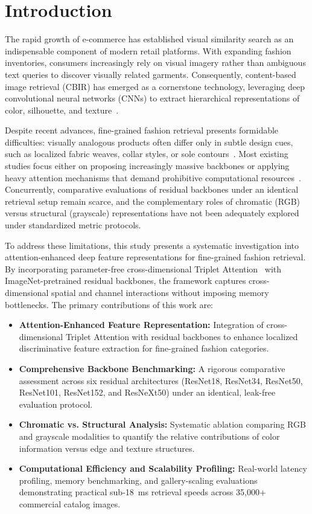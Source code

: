 \documentclass[runningheads]{llncs}
\begin{document}
\section{Introduction}
The rapid growth of e-commerce has established visual similarity search as an indispensable component of modern retail platforms. With expanding fashion inventories, consumers increasingly rely on visual imagery rather than ambiguous text queries to discover visually related garments. Consequently, content-based image retrieval (CBIR) has emerged as a cornerstone technology, leveraging deep convolutional neural networks (CNNs) to extract hierarchical representations of color, silhouette, and texture~\cite{deng2009imagenet,krizhevsky2012imagenet,he2016deep,xie2017aggregated}.

Despite recent advances, fine-grained fashion retrieval presents formidable difficulties: visually analogous products often differ only in subtle design cues, such as localized fabric weaves, collar styles, or sole contours~\cite{liu2016deepfashion,kiapour2015where}. Most existing studies focus either on proposing increasingly massive backbones or applying heavy attention mechanisms that demand prohibitive computational resources~\cite{song2016deep,hu2018squeeze,woo2018cbam,misra2021rotate}. Concurrently, comparative evaluations of residual backbones under an identical retrieval setup remain scarce, and the complementary roles of chromatic (RGB) versus structural (grayscale) representations have not been adequately explored under standardized metric protocols.

To address these limitations, this study presents a systematic investigation into attention-enhanced deep feature representations for fine-grained fashion retrieval. By incorporating parameter-free cross-dimensional Triplet Attention~\cite{misra2021rotate} with ImageNet-pretrained residual backbones, the framework captures cross-dimensional spatial and channel interactions without imposing memory bottlenecks. The primary contributions of this work are:
\begin{itemize}
    \item \textbf{Attention-Enhanced Feature Representation:} Integration of cross-dimensional Triplet Attention with residual backbones to enhance localized discriminative feature extraction for fine-grained fashion categories.
    \item \textbf{Comprehensive Backbone Benchmarking:} A rigorous comparative assessment across six residual architectures (ResNet18, ResNet34, ResNet50, ResNet101, ResNet152, and ResNeXt50) under an identical, leak-free evaluation protocol.
    \item \textbf{Chromatic vs. Structural Analysis:} Systematic ablation comparing RGB and grayscale modalities to quantify the relative contributions of color information versus edge and texture structures.
    \item \textbf{Computational Efficiency and Scalability Profiling:} Real-world latency profiling, memory benchmarking, and gallery-scaling evaluations demonstrating practical sub-18~ms retrieval speeds across 35,000+ commercial catalog images.
\end{itemize}
\end{document}
